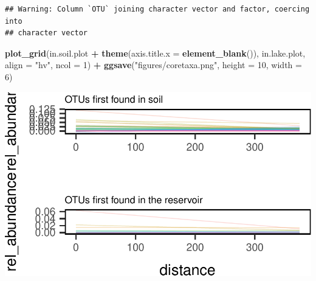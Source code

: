 \documentclass[]{article}
\newenvironment{Shaded}{\begin{snugshade}}{\end{snugshade}}
\newcommand{\KeywordTok}[1]{\textcolor[rgb]{0.13,0.29,0.53}{\textbf{#1}}}
\newcommand{\DataTypeTok}[1]{\textcolor[rgb]{0.13,0.29,0.53}{#1}}
\newcommand{\DecValTok}[1]{\textcolor[rgb]{0.00,0.00,0.81}{#1}}
\newcommand{\StringTok}[1]{\textcolor[rgb]{0.31,0.60,0.02}{#1}}
\newcommand{\OperatorTok}[1]{\textcolor[rgb]{0.81,0.36,0.00}{\textbf{#1}}}
\newcommand{\NormalTok}[1]{#1}
\begin{document}
\begin{verbatim}
## Warning: Column `OTU` joining character vector and factor, coercing into
## character vector
\end{verbatim}

\begin{Shaded}
\begin{Highlighting}[]
\KeywordTok{plot_grid}\NormalTok{(in.soil.plot }\OperatorTok{+}\StringTok{ }\KeywordTok{theme}\NormalTok{(}\DataTypeTok{axis.title.x =} \KeywordTok{element_blank}\NormalTok{()), in.lake.plot, }\DataTypeTok{align =} \StringTok{"hv"}\NormalTok{, }\DataTypeTok{ncol =} \DecValTok{1}\NormalTok{) }\OperatorTok{+}\StringTok{ }\KeywordTok{ggsave}\NormalTok{(}\StringTok{"figures/coretaxa.png"}\NormalTok{, }\DataTypeTok{height =} \DecValTok{10}\NormalTok{, }\DataTypeTok{width =} \DecValTok{6}\NormalTok{)}
\end{Highlighting}
\end{Shaded}

\begin{center}\includegraphics[width=0.7\linewidth]{ReservoirGradient_files/figure-latex/unnamed-chunk-11-1} \end{center}

\begin{Shaded}
\end{Shaded}
\end{document}
